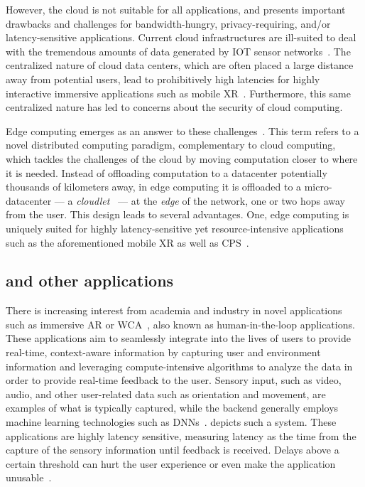 However, the cloud is not suitable for all applications, and presents important drawbacks and challenges for bandwidth-hungry, privacy-requiring, and/or latency-sensitive applications.
Current cloud infrastructures are ill-suited to deal with the tremendous amounts of data generated by \gls{IOT} sensor networks~\cite{shi2016edge}.
The centralized nature of cloud data centers, which are often placed a large distance away from potential users, lead to prohibitively high latencies for highly interactive immersive applications such as mobile \gls{XR}~\cite{satyanarayanan2009case,varghese2016challenges,shi2016promise}.
Furthermore, this same centralized nature has led to concerns about the security of cloud computing.

Edge computing emerges as an answer to these challenges~\cite{satyanarayanan2009case,shi2016promise,shi2016edge,varghese2016challenges,satyanarayanan2017emergence}.
This term refers to a novel distributed computing paradigm, complementary to cloud computing, which tackles the challenges of the cloud by moving computation closer to where it is needed.
Instead of offloading computation to a datacenter potentially thousands of kilometers away, in edge computing it is offloaded to a micro-datacenter --- a \emph{cloudlet}~\cite{satyanarayanan2009case} --- at the \emph{edge} of the network, one or two hops away from the user.
This design leads to several advantages.
One, edge computing is uniquely suited for highly latency-sensitive yet resource-intensive applications such as the aforementioned mobile \gls{XR} as well as \gls{CPS}~\cite{sasaki2016vehicle,wang2018bandwidth,wan2020efficient}.



\subsection{ and other  applications}

There is increasing interest from academia and industry in novel applications such as immersive \gls{AR} or \gls{WCA}~\cite{chatzopoulos2017hyperion,ha2014towards}, also known as human-in-the-loop applications.
These applications aim to seamlessly integrate into the lives of users to provide real-time, context-aware information by capturing user and environment information and leveraging compute-intensive algorithms to analyze the data in order to provide real-time feedback to the user.
Sensory input, such as video, audio, and other user-related data such as orientation and movement, are examples of what is typically captured, while the backend generally employs machine learning technologies such as \glspl{DNN}~\cite{ha2014towards}.
 depicts such a system.
These applications are highly latency sensitive, measuring latency as the time from the capture of the sensory information until feedback is received.
Delays above a certain threshold can hurt the user experience or even make the application unusable~\cite{chen2017empirical}.

